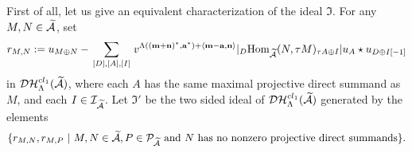 \documentclass[reqno,12pt]{amsart}
\numberwithin{equation}{section}
\def\lr#1{\langle #1\rangle} \def\fin{\hfill$\square$}  \def\lra{\longrightarrow} \def\mod{\mbox{\rm \textbf{mod}}\,}\def\Mod{\mbox{\rm mod}\,}\def\top{\mbox{\rm top}\,}\def\soc{\mbox{\rm soc}\,}
\theoremstyle{plain} %
\theoremstyle{definition} %
\begin{document}
First of all, let us give an equivalent characterization of the ideal $\mathfrak{I}$.
For any $M,N\in \widetilde{\mathcal{A}}$, set
\[
r_{M,N}:=u_{M\oplus N}-\sum\limits_{\begin{smallmatrix}[D],[A],[I]\end{smallmatrix}}v^{\Lambda(({\bf m}+{\bf n})^*,{\bf a}^*)+\lr{{\bf m}-{\bf a},{\bf n}}}|_D\Hom_{\widetilde{\A}}(N,\tau M)_{\tau A\oplus I}|u_{A}\star u_{D\oplus I[-1]}
\]
in $ \mathcal {D}\mathcal {H}_\Lambda^{{cl}_1}(\widetilde{\mathcal{A}})$,
where each $A$  has the same maximal projective direct summand as $M$, and each $I\in\mathcal{I}_{\widetilde{\mathcal{A}}}$.
Let $\mathfrak{I}'$ be the two sided ideal of $\mathcal {D}\mathcal {H}_\Lambda^{{cl}_1}(\widetilde{\mathcal{A}})$ generated by the elements
$$\{r_{M,N}, r_{M,P}~|~M,N\in{\widetilde{\A}}, P\in \mathcal{P}_{\widetilde{\A}}\ \text{and $N$ has no nonzero projective direct summands}\}.$$
\end{document}
